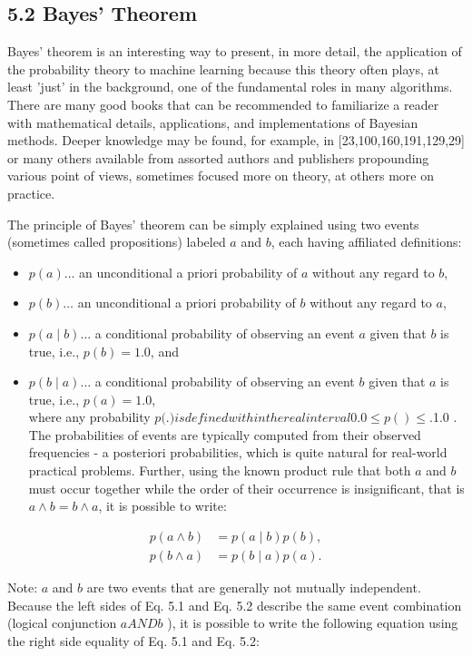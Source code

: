 \documentclass[10pt]{book}
\begin{document}
\subsection*{5.2 Bayes' Theorem}
Bayes' theorem is an interesting way to present, in more detail, the application of the probability theory to machine learning because this theory often plays, at least 'just' in the background, one of the fundamental roles in many algorithms. There are many good books that can be recommended to familiarize a reader with mathematical details, applications, and implementations of Bayesian methods. Deeper knowledge may be found, for example, in [23,100,160,191,129,29] or many others available from assorted authors and publishers propounding various point of views, sometimes focused more on theory, at others more on practice.

The principle of Bayes' theorem can be simply explained using two events (sometimes called propositions) labeled $a$ and $b$, each having affiliated definitions:

\begin{itemize}
  \item $p(a) \ldots$ an unconditional a priori probability of $a$ without any regard to $b$,
  \item $p(b) \ldots$ an unconditional a priori probability of $b$ without any regard to $a$,
  \item $p(a \mid b) \ldots$ a conditional probability of observing an event $a$ given that $b$ is true, i.e., $p(b)=1.0$, and
  \item $p(b \mid a) \ldots$ a conditional probability of observing an event $b$ given that $a$ is true, i.e., $p(a)=1.0$,\\
where any probability $p($.$) is defined within the real interval 0.0 \leq p() \leq$.1.0 . The probabilities of events are typically computed from their observed frequencies - a posteriori probabilities, which is quite natural for real-world practical problems. Further, using the known product rule that both $a$ and $b$ must occur together while the order of their occurrence is insignificant, that is $a \wedge b=b \wedge a$, it is possible to write:
\end{itemize}


\begin{align*}
p(a \wedge b) & =p(a \mid b) p(b),  \tag{5.1}\\
p(b \wedge a) & =p(b \mid a) p(a) . \tag{5.2}
\end{align*}


Note: $a$ and $b$ are two events that are generally not mutually independent.\\
Because the left sides of Eq. 5.1 and Eq. 5.2 describe the same event combination (logical conjunction $a A N D b$ ), it is possible to write the following equation using the right side equality of Eq. 5.1 and Eq. 5.2:
\end{document}
